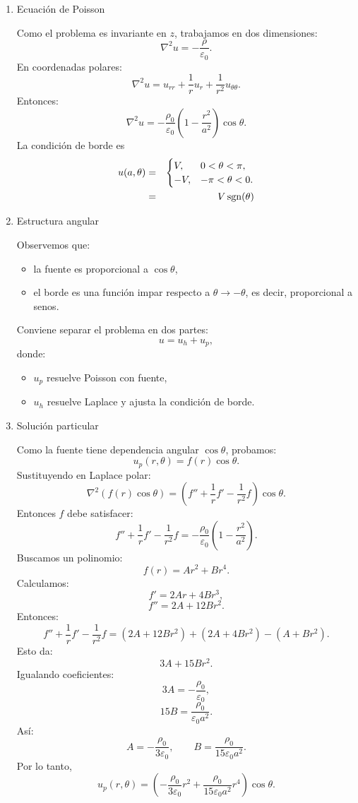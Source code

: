 \documentclass[11pt,spanish]{article}
\newcounter{problema}
\begin{document}
\begin{enumerate}
\item Ecuación de Poisson

Como el problema es invariante en $z$, trabajamos en dos dimensiones:
$$
\nabla^2 u
=
-\frac{\rho}{\varepsilon_0}.
$$
En coordenadas polares:
$$
\nabla^2 u=
u_{rr}
+\frac1r u_r
+\frac1{r^2}u_{\theta\theta}.
$$
Entonces:
$$
\nabla^2 u
=
-\frac{\rho_0}{\varepsilon_0}
\left(
1-\frac{r^2}{a^2}
\right)\cos\theta.
$$
La condición de borde es
\begin{eqnarray}
u(a,\theta)
&=&
\begin{cases}
V, & 0<\theta<\pi,\\
-V, & -\pi<\theta<0.
\end{cases}
\notag
\\
&=&
V 
\operatorname{sgn}(\theta)
\notag
\end{eqnarray}

\item Estructura angular

Observemos que:
\begin{itemize}
\item  la fuente es proporcional a $\cos\theta$,
\item  el borde es una función impar respecto a $\theta\to-\theta$, es decir, proporcional a senos.
\end{itemize}
Conviene separar el problema en dos partes:
$$
u=u_h+u_p,
$$
donde:
\begin{itemize}
\item $u_p$ resuelve Poisson con fuente,
\item $u_h$ resuelve Laplace y ajusta la condición de borde.
\end{itemize}

\item Solución particular

Como la fuente tiene dependencia angular $\cos\theta$, probamos:
$$
u_p(r,\theta)=f(r)\cos\theta.
$$
Sustituyendo en Laplace polar:
$$
\nabla^2(f(r)\cos\theta)
=
\left(
f''+\frac1r f'
-\frac{1}{r^2}f
\right)\cos\theta.
$$
Entonces $f$ debe satisfacer:
$$
f''+\frac1r f'
-\frac{1}{r^2}f
=
-\frac{\rho_0}{\varepsilon_0}
\left(
1-\frac{r^2}{a^2}
\right).
$$
Buscamos un polinomio:
$$
f(r)=Ar^2+Br^4.
$$
Calculamos:
$$
f'=2Ar+4Br^3,
$$
$$
f''=2A+12Br^2.
$$
Entonces:
$$
f''+\frac1r f'-\frac1{r^2}f
=
(2A+12Br^2)
+(2A+4Br^2)
-(A+Br^2).
$$
Esto da:
$$
3A+15Br^2.
$$
Igualando coeficientes:
$$
3A=-\frac{\rho_0}{\varepsilon_0},
$$
$$
15B=
\frac{\rho_0}{\varepsilon_0 a^2}.
$$
Así:
$$
A=-\frac{\rho_0}{3\varepsilon_0},
\qquad
B=\frac{\rho_0}{15\varepsilon_0 a^2}.
$$
Por lo tanto,
$$
u_p(r,\theta)=
\left(
-\frac{\rho_0}{3\varepsilon_0}r^2
+
\frac{\rho_0}{15\varepsilon_0 a^2}r^4
\right)\cos\theta.
$$


\end{enumerate}
\end{document}
